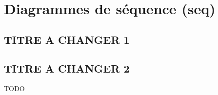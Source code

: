 \chapter{Diagrammes de séquence (seq)}
\section{TITRE A CHANGER 1}

\section{TITRE A CHANGER 2}
TODO
